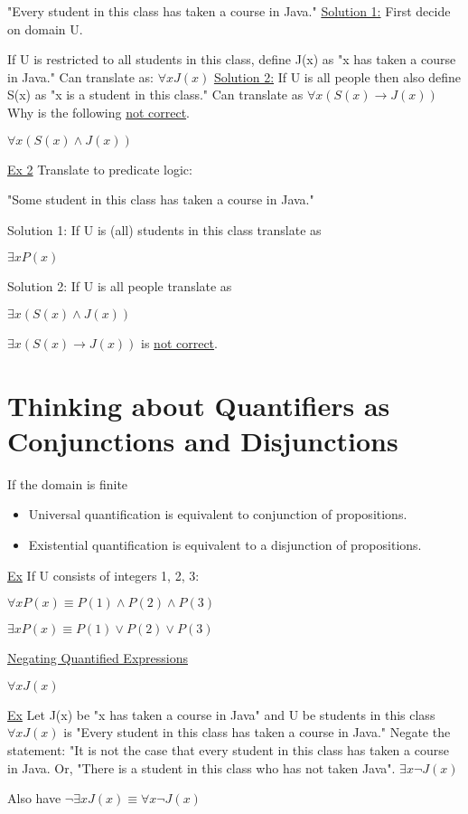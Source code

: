 \documentclass{article}
\begin{document}
"Every student in this class has taken a course in Java."
\hfill \break
\underline{Solution 1:} First decide on domain U.

If U is restricted to all students in this class, define J(x) as "x has taken a course in Java."
\hfill \break
Can translate as: $\forall xJ(x)$
\hfill \break
\underline{Solution 2:} If U is all people then also define S(x) as "x is a student in this class."
\hfill \break
Can translate as $\forall x(S(x)\rightarrow J(x))$
\hfill \break
Why is the following \underline{not correct}.
\begin{center}
    $\forall x(S(x)\land J(x))$
\end{center}
\hfill \break
\underline{Ex 2} Translate to predicate logic:

"Some student in this class has taken a course in Java."

Solution 1: If U is (all) students in this class translate as
\begin{center}
    $\exists xP(x)$
\end{center}

Solution 2: If U is all people translate as
\begin{center}
    $\exists x(S(x)\land J(x))$
\end{center}

\underline{$\exists x(S(x)\rightarrow J(x))$} is \underline{not correct}.

\section{Thinking about Quantifiers as Conjunctions and Disjunctions}
If the domain is finite
\begin{itemize}
    \item Universal quantification is equivalent to conjunction of propositions.
    \item Existential quantification is equivalent to a disjunction of propositions.
\end{itemize}
\underline{Ex} If U consists of integers 1, 2, 3:

$\forall xP(x)\equiv P(1)\land P(2)\land P(3)$

$\exists xP(x)\equiv P(1)\lor P(2)\lor P(3)$

\hfill \break
\underline{Negating Quantified Expressions}
\begin{center}
    $\forall xJ(x)$
\end{center}
\hfill \break
\underline{Ex} Let J(x) be "x has taken a course in Java" and U be students in this class
\hfill \break
$\forall xJ(x)$ is "Every student in this class has taken a course in Java."
\hfill \break
Negate the statement: "It is not the case that every student in this class has taken a course in Java. Or, "There is a student in this class who has not taken Java". $\exists x\lnot J(x)$

\hfill \break
Also have
\hfill \break
$\lnot\exists xJ(x)\equiv\forall x\lnot J(x)$
\end{document}
